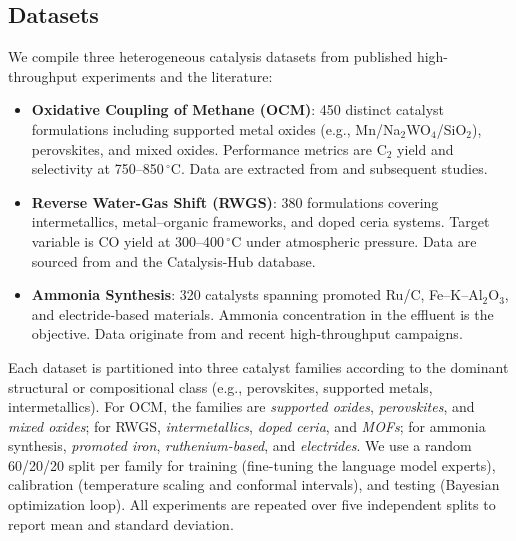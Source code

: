 \documentclass{article}
\begin{document}
\subsection{Datasets}
We compile three heterogeneous catalysis datasets from published high-throughput experiments and the literature:
\begin{itemize}
    \item \textbf{Oxidative Coupling of Methane (OCM)}: 450 distinct catalyst formulations including supported metal oxides (e.g., Mn/Na$_2$WO$_4$/SiO$_2$), perovskites, and mixed oxides. Performance metrics are C$_2$ yield and selectivity at 750--850\,$^\circ$C. Data are extracted from \citet{zavyalova2011} and subsequent studies.
    \item \textbf{Reverse Water-Gas Shift (RWGS)}: 380 formulations covering intermetallics, metal–organic frameworks, and doped ceria systems. Target variable is CO yield at 300--400\,$^\circ$C under atmospheric pressure. Data are sourced from \citet{daza2021} and the Catalysis-Hub database.
    \item \textbf{Ammonia Synthesis}: 320 catalysts spanning promoted Ru/C, Fe–K–Al$_2$O$_3$, and electride-based materials. Ammonia concentration in the effluent is the objective. Data originate from \citet{jacobsen2001} and recent high-throughput campaigns.
\end{itemize}
Each dataset is partitioned into three catalyst families according to the dominant structural or compositional class (e.g., perovskites, supported metals, intermetallics). For OCM, the families are \emph{supported oxides}, \emph{perovskites}, and \emph{mixed oxides}; for RWGS, \emph{intermetallics}, \emph{doped ceria}, and \emph{MOFs}; for ammonia synthesis, \emph{promoted iron}, \emph{ruthenium-based}, and \emph{electrides}. We use a random 60/20/20 split per family for training (fine-tuning the language model experts), calibration (temperature scaling and conformal intervals), and testing (Bayesian optimization loop). All experiments are repeated over five independent splits to report mean and standard deviation.
\end{document}

